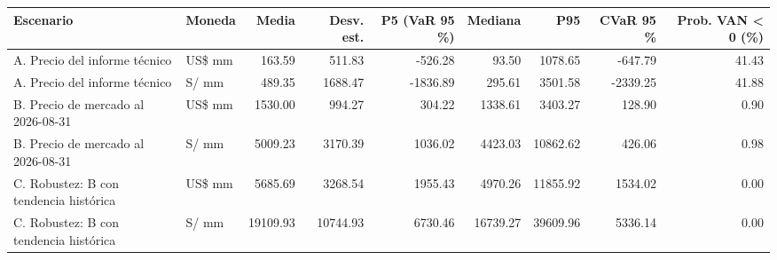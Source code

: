 \begin{tabular}{llrrrrrrr}
\toprule
Escenario & Moneda & Media & Desv. est. & P5 (VaR 95 \%) & Mediana & P95 & CVaR 95 \% & Prob. VAN < 0 (\%) \\
\midrule
A. Precio del informe técnico & US\$ mm & 163.59 & 511.83 & -526.28 & 93.50 & 1078.65 & -647.79 & 41.43 \\
A. Precio del informe técnico & S/ mm & 489.35 & 1688.47 & -1836.89 & 295.61 & 3501.58 & -2339.25 & 41.88 \\
B. Precio de mercado al 2026-08-31 & US\$ mm & 1530.00 & 994.27 & 304.22 & 1338.61 & 3403.27 & 128.90 & 0.90 \\
B. Precio de mercado al 2026-08-31 & S/ mm & 5009.23 & 3170.39 & 1036.02 & 4423.03 & 10862.62 & 426.06 & 0.98 \\
C. Robustez: B con tendencia histórica & US\$ mm & 5685.69 & 3268.54 & 1955.43 & 4970.26 & 11855.92 & 1534.02 & 0.00 \\
C. Robustez: B con tendencia histórica & S/ mm & 19109.93 & 10744.93 & 6730.46 & 16739.27 & 39609.96 & 5336.14 & 0.00 \\
\bottomrule
\end{tabular}
